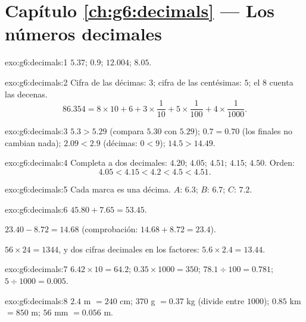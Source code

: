 \section*{Capítulo \ref{ch:g6:decimals} --- Los números decimales}

\begin{solution}{exo:g6:decimals:1}
$5.37$; \quad $0.9$; \quad $12.004$; \quad $8.05$.
\end{solution}

\begin{solution}{exo:g6:decimals:2}
Cifra de las décimas: $3$; cifra de las centésimas: $5$; el $8$ cuenta las decenas.
\[
86.354 = 8 \times 10 + 6 + 3 \times \frac{1}{10} + 5 \times
\frac{1}{100} + 4 \times \frac{1}{1000}.
\]
\end{solution}

\begin{solution}{exo:g6:decimals:3}
$5.3 > 5.29$ (compara $5.30$ con $5.29$); \quad
$0.7 = 0.70$ (los  finales no cambian nada); \quad
$2.09 < 2.9$ (décimas: $0 < 9$); \quad
$14.5 > 14.49$.
\end{solution}

\begin{solution}{exo:g6:decimals:4}
Completa a dos decimales: $4.20$; $4.05$; $4.51$; $4.15$; $4.50$. Orden:
\[
4.05 < 4.15 < 4.2 < 4.5 < 4.51 .
\]
\end{solution}

\begin{solution}{exo:g6:decimals:5}
Cada marca es una décima. $A$: $6.3$; \quad $B$: $6.7$; \quad
$C$: $7.2$.
\end{solution}

\begin{solution}{exo:g6:decimals:6}
$45.80 + 7.65 = 53.45$.

$23.40 - 8.72 = 14.68$ (comprobación: $14.68 + 8.72 = 23.4$).

$56 \times 24 = 1344$, y dos cifras decimales en los factores:
$5.6 \times 2.4 = 13.44$.
\end{solution}

\begin{solution}{exo:g6:decimals:7}
$6.42 \times 10 = 64.2$; \quad
$0.35 \times 1000 = 350$; \quad
$78.1 \div 100 = 0.781$; \quad
$5 \div 1000 = 0.005$.
\end{solution}

\begin{solution}{exo:g6:decimals:8}
$2.4$ m $= 240$ cm; \quad $370$ g $= 0.37$ kg (divide entre $1000$);
\quad $0.85$ km $= 850$ m; \quad $56$ mm $= 0.056$ m.
\end{solution}

